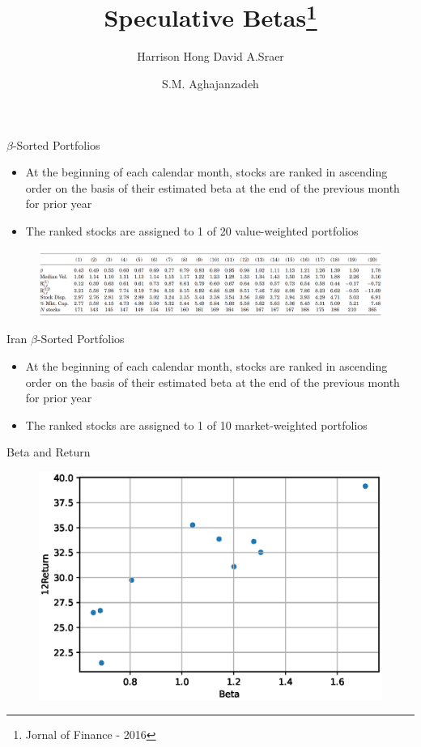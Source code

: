 \documentclass{beamer}
\title[Speculative Betas]{Speculative Betas\footnote{ \tiny Jornal of Finance - 2016}}
\subtitle{Harrison Hong \qquad David A.Sraer}
\author[Aghajanzadeh]{S.M. Aghajanzadeh  }
\institute[]{Tehran Institute for Advanced Studies }
\begin{document}
{\maketitle}
\small

\begin{frame}{$ \beta $-Sorted Portfolios}
	\begin{itemize}
		\item At the beginning of each calendar month, stocks are ranked in ascending order on the basis of their estimated beta at the end of the previous month for prior year
		\item The ranked stocks are assigned to 1 of 20 value-weighted portfolios
	\end{itemize}
	\begin{figure}
		\centering
		\includegraphics[width=0.9\linewidth]{"../Paper Presentaion/t1"}
	\end{figure}
\end{frame}



\begin{frame}{Iran $ \beta $-Sorted Portfolios}
	\begin{itemize}
	\item At the beginning of each calendar month, stocks are ranked in ascending order on the basis of their estimated beta at the end of the previous month for prior year
	\item The ranked stocks are assigned to 1 of 10 market-weighted portfolios
\end{itemize}	
	\begin{table}[htbp]
		\centering
		\resizebox{0.9\textwidth}{!}{
			
			\label{tab:addlabel}	
		}
	\end{table}
\end{frame}
\begin{frame}{Beta and Return}
	\begin{figure}
		\centering
		\includegraphics[width=0.7\linewidth]{BetaReturn10.eps}
		\label{fig:BetaReturn}
	\end{figure}
	
\end{frame}
\end{document}
